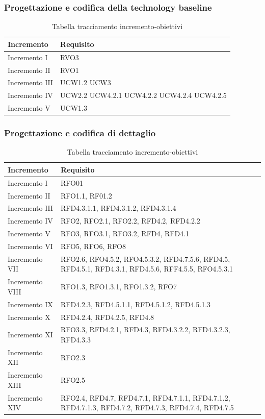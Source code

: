 \documentclass[../piano_di_progetto.tex]{subfiles}
\begin{document}
\subsubsection*{Progettazione e codifica della technology baseline}
\begin{table}[!ht]
	\centering
	\begin{tabular}{|p{3cm}|p{6.5cm}|}
	\hline
	\rowcolor{lightgray}
    \textbf{Incremento} & \textbf{Requisito}\\
    \hline
        Incremento I & RVO3\\
        Incremento II & RVO1\\
        Incremento III & UCW1.2  UCW3 \\
        Incremento IV & UCW2.2 UCW4.2.1 UCW4.2.2 UCW4.2.4 UCW4.2.5\\
        Incremento V & UCW1.3\\
    \hline
    \end{tabular}
    \caption{Tabella tracciamento incremento-obiettivi}
\end{table}

\newpage

\subsubsection*{Progettazione e codifica di dettaglio}

\begin{table}[!h]
	\centering
	\begin{tabular}{|p{3cm}|p{6.5cm}|}
	\hline
	\rowcolor{lightgray}
    \textbf{Incremento} & \textbf{Requisito}\\
    \hline
        Incremento I & RFO01 \\
        Incremento II & RFO1.1, RF01.2 \\
        Incremento III & RFD4.3.1.1, RFD4.3.1.2, RFD4.3.1.4 \\
        Incremento IV & RFO2, RFO2.1, RFO2.2, RFD4.2, RFD4.2.2 \\
        Incremento V & RFO3, RFO3.1, RFO3.2, RFD4, RFD4.1 \\	
        Incremento VI &  RFO5, RFO6, RFO8 \\
        Incremento VII & RFO2.6, RFO4.5.2, RFO4.5.3.2, RFD4.7.5.6, RFD4.5, RFD4.5.1, RFD4.3.1, RFD4.5.6, RFF4.5.5, RFO4.5.3.1 \\
        Incremento VIII & RFO1.3, RFO1.3.1, RFO1.3.2, RFO7 \\
        Incremento IX & RFD4.2.3, RFD4.5.1.1, RFD4.5.1.2, RFD4.5.1.3 \\
        Incremento X & RFD4.2.4, RFD4.2.5, RFD4.8 \\
        Incremento XI & RFO3.3, RFD4.2.1, RFD4.3, RFD4.3.2.2, RFD4.3.2.3, RFD4.3.3 \\
        Incremento XII & RFO2.3 \\
        Incremento XIII & RFO2.5 \\
        Incremento XIV & RFO2.4, RFD4.7, RFD4.7.1, RFD4.7.1.1, RFD4.7.1.2, RFD4.7.1.3, RFD4.7.2, RFD4.7.3, RFD4.7.4, RFD4.7.5 \\        
    \hline	
	\end{tabular}
	\caption{Tabella tracciamento incremento-obiettivi}
\end{table}
\end{document}
